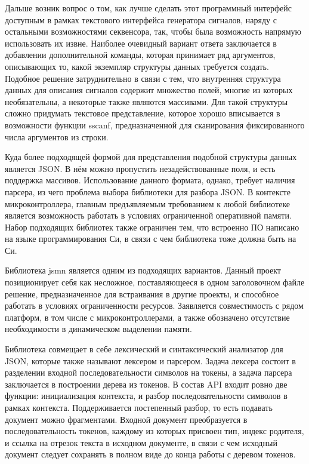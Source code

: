 \documentclass{report}
\begin{document}
Дальше возник вопрос о том, как лучше сделать этот программный интерфейс доступным в рамках текстового интерфейса генератора сигналов, наряду с остальными возможностями секвенсора, так, чтобы была возможность напрямую использовать их извне. Наиболее очевидный вариант ответа заключается в добавлении дополнительной команды, которая принимает ряд аргументов, описывающих то, какой экземпляр структуры данных требуется создать. Подобное решение затруднительно в связи с тем, что внутренняя структура данных для описания сигналов содержит множество полей, многие из которых необязательны, а некоторые также являются массивами. Для такой структуры сложно придумать текстовое представление, которое хорошо вписывается в возможности функции sscanf, предназначенной для сканирования фиксированного числа аргументов из строки.

Куда более подходящей формой для представления подобной структуры данных является JSON. В нём можно пропустить незадействованные поля, и есть поддержка массивов. Использование данного формата, однако, требует наличия парсера, из чего проблема выбора библиотеки для разбора JSON. В контексте микроконтроллера, главным предъявляемым требованием к любой библиотеке является возможность работать в условиях ограниченной оперативной памяти. Набор подходящих библиотек также ограничен тем, что встроенно ПО написано на языке программирования Си, в связи с чем библиотека тоже должна быть на Си.

Библиотека jsmn \cite{jsmn} является одним из подходящих вариантов. Данный проект позиционирует себя как несложное, поставляющееся в одном заголовочном файле решение, предназначенное для встраивания в другие проекты, и способное работать в условиях ограниченности ресурсов. Заявляется совместимость с рядом платформ, в том числе с микроконтроллерами, а также обозначено отсутствие необходимости в динамическом выделении памяти.

Библиотека совмещает в себе лексический и синтаксический анализатор для JSON, которые также называют лексером и парсером. Задача лексера состоит в разделении входной последовательности символов на токены, а задача парсера заключается в построении дерева из токенов. В состав API входит ровно две функции: инициализация контекста, и разбор последовательности символов в рамках контекста. Поддерживается постепенный разбор, то есть подавать документ можно фрагментами. Входной документ преобразуется в последовательность токенов, каждому из которых присвоен тип, индекс родителя, и ссылка на отрезок текста в исходном документе, в связи с чем исходный документ следует сохранять в полном виде до конца работы с деревом токенов.
\end{document}
